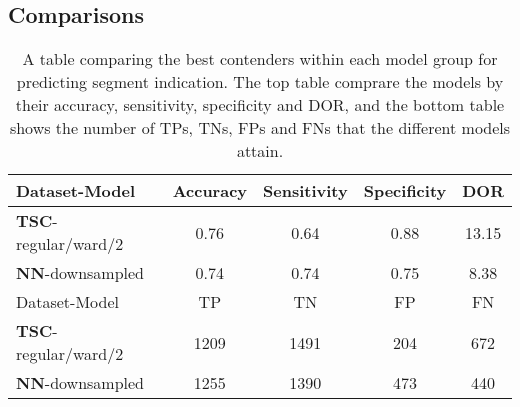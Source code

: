 \subsection{Comparisons}

\begin{table*}
    \centering
    \begin{tabular}{lcccc}
        \toprule
        Dataset-Model               & Accuracy & Sensitivity & Specificity & DOR \\
        \midrule
        \textbf{TSC}-regular/ward/2 &     0.76 &        0.64 &        0.88 & 13.15 \\
        \textbf{NN}-downsampled     &     0.74 &        0.74 &        0.75 & 8.38 \\
        \midrule
        Dataset-Model               &  TP  &  TN  &  FP  &  FN \\
        \midrule
        \textbf{TSC}-regular/ward/2 & 1209 & 1491 &  204 &  672 \\
        \textbf{NN}-downsampled     & 1255 & 1390 &  473 &  440 \\
        \bottomrule
    \end{tabular}
    \caption{A table comparing the best contenders within each model group for predicting segment indication. 
             The top table comprare the models by their accuracy, sensitivity, specificity and DOR, 
             and the bottom table shows the number of TPs, TNs, FPs and FNs that the different models attain.}
    \label{tab:segm_ind_compare}
\end{table*}

\begin{comment}
    [ ] \textbf{How big is the difference in performance between the models?}
    [ ] \textbf{}
    [ ] \textbf{}
\end{comment}

